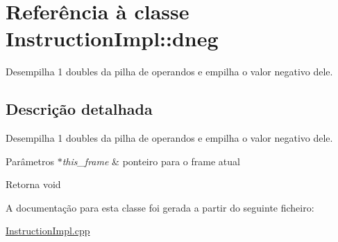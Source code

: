 \hypertarget{class_instruction_impl_1_1dneg}{}\section{Referência à classe Instruction\+Impl\+:\+:dneg}
\label{class_instruction_impl_1_1dneg}


Desempilha 1 doubles da pilha de operandos e empilha o valor negativo dele.  




\subsection{Descrição detalhada}
Desempilha 1 doubles da pilha de operandos e empilha o valor negativo dele. 


\begin{DoxyParams}{Parâmetros}
{\em $\ast$this\+\_\+frame} & ponteiro para o frame atual \\
\hline
\end{DoxyParams}
\begin{DoxyReturn}{Retorna}
void 
\end{DoxyReturn}


A documentação para esta classe foi gerada a partir do seguinte ficheiro\+:\begin{DoxyCompactItemize}
\item 
\hyperlink{_instruction_impl_8cpp}{Instruction\+Impl.\+cpp}\end{DoxyCompactItemize}

